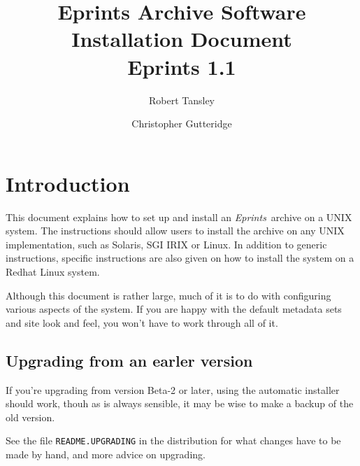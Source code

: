 \documentclass[a4paper]{article}
\title{Eprints Archive Software Installation Document\\Eprints 1.1}
\author{Robert Tansley \and Christopher Gutteridge}
\newcommand{\eprints}{\emph{Eprints}}
\begin{document}
\maketitle

\tableofcontents

\section{Introduction}


This document explains how to set up and install an \eprints\ archive on a UNIX system. The instructions should allow users to install the archive on any UNIX implementation, such as Solaris, SGI IRIX or Linux. In addition to generic instructions, specific instructions are also given on how to install the system on a Redhat Linux system.

Although this document is rather large, much of it is to do with configuring various aspects of the system. If you are happy with the default metadata sets and site look and feel, you won't have to work through all of it.



\subsection{Upgrading from an earler version}

If you're upgrading from version Beta-2 or later, using the automatic installer should work, thouh as is always sensible, it may be wise to make a backup of the old version. 

\par See the file {\tt README.UPGRADING} in the distribution for what changes have to be made by hand, and more advice on upgrading.


\end{document}
